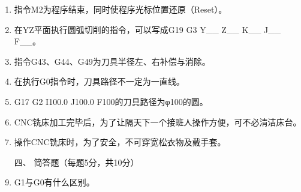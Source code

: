 \documentclass[12pt,twocolumn,landscape,UTF8,twoside]{ctexart}
\begin{document}
\begin{spacing}{1.3}
\begin{enumerate} [1、]
\item 指令M2为程序结束，同时使程序光标位置还原（Reset）。
\item 在YZ平面执行圆弧切削的指令，可以写成G19 G3 Y\_\_ Z\_\_ K\_\_ J\_\_ F\_\_。
\item 指令G43、G44、G49为刀具半径左、右补偿与消除。
\item 在执行G0指令时，刀具路径不一定为一直线。
\item G17 G2 I100.0 J100.0 F100的刀具路径为φ100的圆。
\item CNC铣床加工完毕后，为了让隔天下一个接班人操作方便，可不必清洁床台。
\item 操作CNC铣床时，为了安全，不可穿宽松衣物及戴手套。

\vspace{1cm}
	
\item[\heiti 四、] {\heiti 简答题（每题5分，共10分）}

%
%
%
	
\item G1与G0有什么区别。
\end{enumerate}
\end{spacing}
\end{document}
